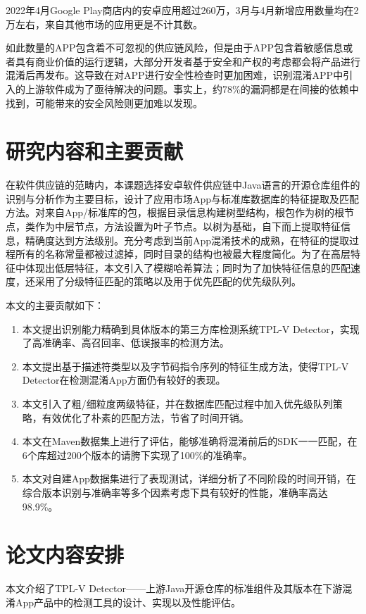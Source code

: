 2022年4月Google Play商店内的安卓应用超过260万，3月与4月新增应用数量均在2万左右，来自其他市场的应用更是不计其数。

如此数量的APP包含着不可忽视的供应链风险，但是由于APP包含着敏感信息或者具有商业价值的运行逻辑，大部分开发者基于安全和产权的考虑都会将产品进行混淆后再发布。这导致在对APP进行安全性检查时更加困难，识别混淆APP中引入的上游软件成为了亟待解决的问题。事实上，约78\%的漏洞都是在间接的依赖中找到，可能带来的安全风险则更加难以发现\cite{qianxin.com}。


\section{研究内容和主要贡献}
在软件供应链的范畴内，本课题选择安卓软件供应链中Java语言的开源仓库组件的识别与分析作为主要目标，设计了应用市场App与标准库数据库的特征提取及匹配方法。对来自App/标准库的包，根据目录信息构建树型结构，根包作为树的根节点，类作为中层节点，方法设置为叶子节点。以树为基础，自下而上提取特征信息，精确度达到方法级别。充分考虑到当前App混淆技术的成熟，在特征的提取过程所有的名称常量都被过滤掉，同时目录的结构也被最大程度简化。为了在高层特征中体现出低层特征，本文引入了模糊哈希算法；同时为了加快特征信息的匹配速度，还采用了分级特征匹配的策略以及用于优先匹配的优先级队列。

本文的主要贡献如下：

\begin{enumerate}
\item{本文提出识别能力精确到具体版本的第三方库检测系统TPL-V Detector，实现了高准确率、高召回率、低误报率的检测方法。}
\item{本文提出基于描述符类型以及字节码指令序列的特征生成方法，使得TPL-V Detector在检测混淆App方面仍有较好的表现。}
\item{本文引入了粗/细粒度两级特征，并在数据库匹配过程中加入优先级队列策略，有效优化了朴素的匹配方法，节省了时间开销。}
\item{本文在Maven数据集上进行了评估，能够准确将混淆前后的SDK一一匹配，在6个库超过200个版本的请胯下实现了100\%的准确率。}
\item{本文对自建App数据集进行了表现测试，详细分析了不同阶段的时间开销，在综合版本识别与准确率等多个因素考虑下具有较好的性能，准确率高达98.9\%。}
\end{enumerate}


\section{论文内容安排}
本文介绍了TPL-V Detector——上游Java开源仓库的标准组件及其版本在下游混淆App产品中的检测工具的设计、实现以及性能评估。

